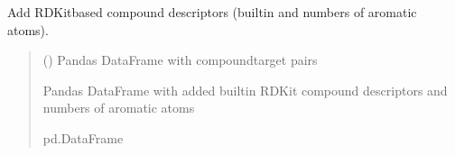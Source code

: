 \documentclass[letterpaper,10pt,english]{sphinxmanual}
\begin{document}
\begin{fulllineitems}
\label{\detokenize{add_rdkit_compound_descriptors:add_rdkit_compound_descriptors.add_rdkit_compound_descriptors}}
\pysigstartsignatures
{}
\pysigstopsignatures
\sphinxAtStartPar
Add RDKit\sphinxhyphen{}based compound descriptors (built\sphinxhyphen{}in and numbers of aromatic atoms).
\begin{quote}\begin{description}
\sphinxAtStartPar
{} () \textendash{} Pandas DataFrame with compound\sphinxhyphen{}target pairs

\sphinxAtStartPar
Pandas DataFrame with added built\sphinxhyphen{}in RDKit compound descriptors
and numbers of aromatic atoms

\sphinxAtStartPar
pd.DataFrame

\end{description}\end{quote}

\end{fulllineitems}

\end{document}
